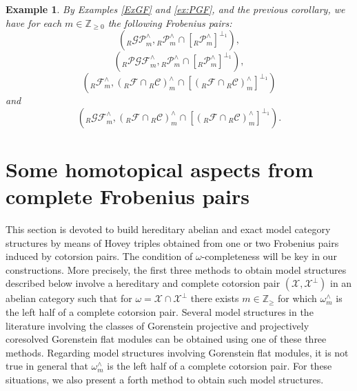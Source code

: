 \documentclass[10pt,reqno]{amsart}
\numberwithin{equation}{section}
\newtheorem{example}[definition]{Example}
\theoremstyle{remark}
\begin{document}
\begin{example}
By Examples \ref{ExGF} and \ref{ex:PGF}, and the previous corollary, we have  for each $m \in \mathbb{Z}_{\geq 0}$ the following Frobenius pairs:
\[
({}_R\mathcal{GP}^\wedge_m, {}_R\mathcal{P}^\wedge_m \cap [{}_R\mathcal{P}^\wedge_m]^{\perp_1}),
\]
\[
({}_R\mathcal{PGF}^\wedge_m, {}_R\mathcal{P}^\wedge_m \cap [{}_R\mathcal{P}^\wedge_m]^{\perp_1}),
\]
\[
({}_R\mathcal{F}^\wedge_m, ({}_R\mathcal{F} \cap {}_R\mathcal{C})^\wedge_m \cap [({}_R\mathcal{F} \cap {}_R\mathcal{C})^\wedge_m]^{\perp_1})
\]
and
\[
({}_R\mathcal{GF}^\wedge_m, ({}_R\mathcal{F} \cap {}_R\mathcal{C})^\wedge_m \cap [({}_R\mathcal{F} \cap {}_R\mathcal{C})^\wedge_m]^{\perp_1}).
\]
\end{example}



\section{Some homotopical aspects from complete Frobenius pairs} \label{sec:model_structures}

This section is devoted to build hereditary abelian and exact model category structures by means of Hovey triples obtained from one or two Frobenius pairs induced by cotorsion pairs. The condition of $\omega$-completeness will be key in our constructions. More precisely, the first three methods to obtain model structures described below involve a hereditary and complete cotorsion pair $(\mathcal{X},\mathcal{X}^\perp)$ in an abelian category such that for $\omega = \mathcal{X} \cap \mathcal{X}^\perp$ there exists $m \in \mathbb{Z}_{\geq}$ for which $\omega^\wedge_m$ is the left half of a complete cotorsion pair. Several model structures in the literature involving the classes of Gorenstein projective and projectively coresolved Gorenstein flat modules can be obtained using one of these three methods. Regarding model structures involving Gorenstein flat modules, it is not true in general that $\omega^\wedge_m$ is the left half of a complete cotorsion pair. For these situations, we also present a forth method to obtain such model structures. \\
\end{document}
